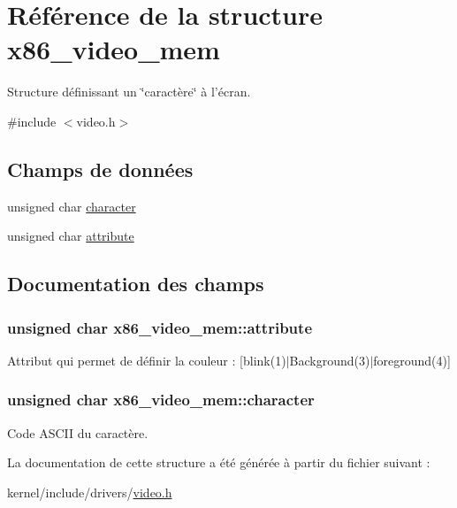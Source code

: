 \hypertarget{structx86__video__mem}{\section{Référence de la structure x86\-\_\-video\-\_\-mem}
\label{structx86__video__mem}
}


Structure définissant un \char`\"{}caractère\char`\"{} à l'écran.  




{\ttfamily \#include $<$video.\-h$>$}

\subsection*{Champs de données}
\begin{DoxyCompactItemize}
\item 
unsigned char \hyperlink{structx86__video__mem_a806c83cac2d0536c833f810347f5539a}{character}
\item 
unsigned char \hyperlink{structx86__video__mem_ab513d18ce9ef33e2d22e426973fd7417}{attribute}
\end{DoxyCompactItemize}


\subsection{Documentation des champs}
\hypertarget{structx86__video__mem_ab513d18ce9ef33e2d22e426973fd7417}{
\subsubsection[{attribute}]{\setlength{\rightskip}{0pt plus 5cm}unsigned char x86\-\_\-video\-\_\-mem\-::attribute}}\label{structx86__video__mem_ab513d18ce9ef33e2d22e426973fd7417}
Attribut qui permet de définir la couleur \-: \mbox{[}blink(1)$|$\-Background(3)$|$foreground(4)\mbox{]} \hypertarget{structx86__video__mem_a806c83cac2d0536c833f810347f5539a}{
\subsubsection[{character}]{\setlength{\rightskip}{0pt plus 5cm}unsigned char x86\-\_\-video\-\_\-mem\-::character}}\label{structx86__video__mem_a806c83cac2d0536c833f810347f5539a}
Code A\-S\-C\-I\-I du caractère. 

La documentation de cette structure a été générée à partir du fichier suivant \-:\begin{DoxyCompactItemize}
\item 
kernel/include/drivers/\hyperlink{video_8h}{video.\-h}\end{DoxyCompactItemize}
